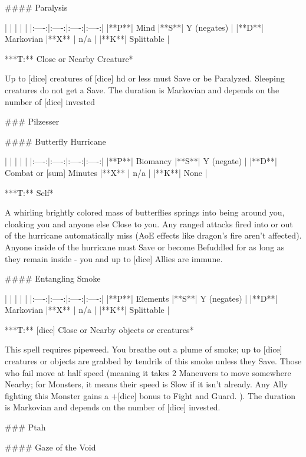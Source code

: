 #### Paralysis

| | | | |
|:----:|:----:|:----:|:----:|
|**P**| Mind |**S**|  Y (negates) |
|**D**| Markovian |**X** |  n/a  |
|**K**| Splittable |


***T:**   Close or Nearby Creature*



Up to [dice] creatures of [dice] {hd} or less must Save or be Paralyzed.  Sleeping creatures do not get a Save. The duration is Markovian and depends on the number of [dice] invested



### Pilzesser





#### Butterfly Hurricane

| | | | |
|:----:|:----:|:----:|:----:|
|**P**| Biomancy |**S**|  Y (negate) |
|**D**| Combat or [sum] Minutes |**X** |  n/a  |
|**K**| None |


***T:**   Self*



A whirling brightly colored mass of butterflies springs into being around you, cloaking you and anyone else Close to you.  Any ranged attacks fired into or out of the hurricane automatically miss (AoE effects like dragon's fire aren't affected).  Anyone inside of the hurricane must Save or become Befuddled for as long as they remain inside - you and up to [dice] Allies are immune.




#### Entangling Smoke 

| | | | |
|:----:|:----:|:----:|:----:|
|**P**| Elements |**S**|  Y (negates) |
|**D**| Markovian |**X** |  n/a  |
|**K**| Splittable |


***T:**   [dice] Close or Nearby objects or creatures*



This spell requires pipeweed.  You breathe out a plume of smoke; up to [dice] creatures or objects are grabbed by tendrils of this smoke unless they Save.  Those who fail move at half speed (meaning it takes 2 Maneuvers to move somewhere Nearby; for Monsters, it means their speed is Slow if it isn't already.  Any Ally fighting this Monster gains a +[dice] bonus to Fight and Guard. ). The duration is Markovian and depends on the number of [dice] invested.

### Ptah





#### Gaze of the Void

